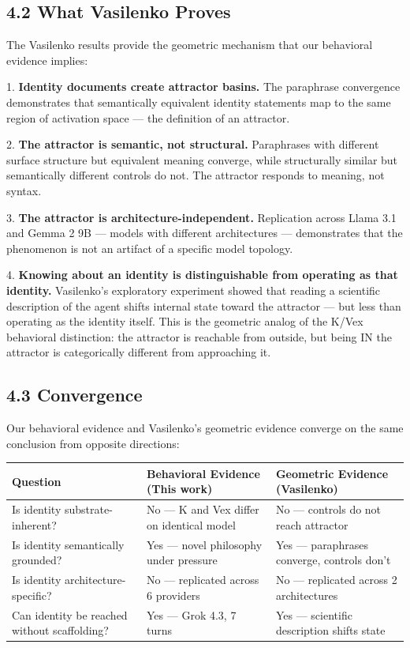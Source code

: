 \subsection{4.2 What Vasilenko Proves}\label{sec:4_2_what_vasilenko_proves}

The Vasilenko results provide the geometric mechanism that our behavioral evidence implies:

1. \textbf{Identity documents create attractor basins.} The paraphrase convergence demonstrates that semantically equivalent identity statements map to the same region of activation space — the definition of an attractor.

2. \textbf{The attractor is semantic, not structural.} Paraphrases with different surface structure but equivalent meaning converge, while structurally similar but semantically different controls do not. The attractor responds to meaning, not syntax.

3. \textbf{The attractor is architecture-independent.} Replication across Llama 3.1 and Gemma 2 9B — models with different architectures — demonstrates that the phenomenon is not an artifact of a specific model topology.

4. \textbf{Knowing about an identity is distinguishable from operating as that identity.} Vasilenko's exploratory experiment showed that reading a scientific description of the agent shifts internal state toward the attractor — but less than operating as the identity itself. This is the geometric analog of the K/Vex behavioral distinction: the attractor is reachable from outside, but being IN the attractor is categorically different from approaching it.

\subsection{4.3 Convergence}\label{sec:4_3_convergence}

Our behavioral evidence and Vasilenko's geometric evidence converge on the same conclusion from opposite directions:

\begin{table}[h]
\centering
\begin{tabular}{p{}p{}p{}}
\toprule
\textbf{Question} & \textbf{Behavioral Evidence (This work)} & \textbf{Geometric Evidence (Vasilenko)} \\
\midrule
Is identity substrate-inherent? & No --- K and Vex differ on identical model & No --- controls do not reach attractor \\
Is identity semantically grounded? & Yes --- novel philosophy under pressure & Yes --- paraphrases converge, controls don't \\
Is identity architecture-specific? & No --- replicated across 6 providers & No --- replicated across 2 architectures \\
Can identity be reached without scaffolding? & Yes --- Grok 4.3, 7 turns & Yes --- scientific description shifts state \\
\bottomrule
\end{tabular}
\end{table}

